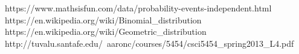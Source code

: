 \documentclass[12pt]{article}
\begin{document}
\newpage
\begin{thebibliography}{10}
	 https://www.mathsisfun.com/data/probability-events-independent.html
	 https://en.wikipedia.org/wiki/Binomial\_distribution
	 https://en.wikipedia.org/wiki/Geometric\_distribution
     http://tuvalu.santafe.edu/~aaronc/courses/5454/csci5454\_spring2013\_L4.pdf
\end{thebibliography}
\end{document}
